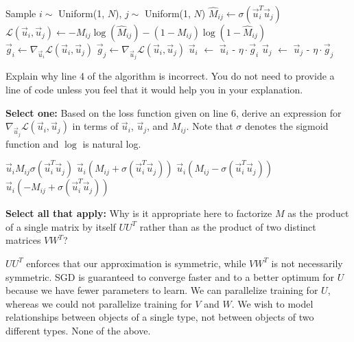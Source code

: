 \documentclass[11pt,addpoints,answers]{exam}
\newcommand{\sall}{\textbf{Select all that apply: }}
\newcommand{\sone}{\textbf{Select one: }}
\begin{document}
\begin{questions}
\begin{parts}
\begin{algorithm}
\begin{algorithmic}[1]
    \State Sample $i \sim$ Uniform(1, $N$), $j \sim$ Uniform(1, $N$)
    \State $\hat{M}_{ij} \gets \sigma(\vec{u}_i^T \vec{u}_j)$ 
    \State $\mathcal{L}(\vec{u}_i, \vec{u}_j) \gets -M_{ij} \log(\hat{M}_{ij}) - (1-M_{ij})\log(1 - \hat{M}_{ij})$
    \State $\vec{g}_i \gets \nabla_{\vec{u}_i} \mathcal{L}(\vec{u}_i, \vec{u}_j)$
    \State $\vec{g}_j \gets \nabla_{\vec{u}_j} \mathcal{L}(\vec{u}_i, \vec{u}_j)$
    \State $\vec{u}_i$ $\gets$ $\vec{u}_i$ - $\eta \cdot \vec{g}_i$
    \State $\vec{u}_j$ $\gets$ $\vec{u}_j$ - $\eta \cdot \vec{g}_j$
\EndWhile
\end{algorithmic}
\end{algorithm}
\newpage
\begin{subparts}
\subpart[1] Explain why line 4 of the algorithm is incorrect.
You do not need to provide a line of code unless you feel that it would help you in your explanation.

    \begin{your_solution}[title=Explanation, height=3cm, width=0.9\textwidth]
    \end{your_solution}

\subpart[1] \sone Based on the loss function given on line 6, derive an expression for $\nabla_{\vec{u}_j} \mathcal{L}(\vec{u}_i, \vec{u}_j)$ in terms of $\vec{u}_i$, $\vec{u}_j$, and $M_{ij}$. Note that $\sigma$ denotes the sigmoid function and $\log$ is natural log.
    \begin{checkboxes}
    \choice $\vec{u}_i M_{ij} \sigma(\vec{u}_i^T \vec{u}_j)$
    \choice $\vec{u}_i(M_{ij} + \sigma(\vec{u}_i^T \vec{u}_j))$
    \choice $\vec{u}_i(M_{ij} - \sigma(\vec{u}_i^T \vec{u}_j))$
    \choice $\vec{u}_i(-M_{ij} + \sigma(\vec{u}_i^T \vec{u}_j))$
    \end{checkboxes}
         
    

\subpart[2] \sall Why is it appropriate here to factorize $M$ as the product of a single matrix by itself $U U^T$ rather than as the product of two distinct matrices $VW^T$?
    {\checkboxchar{$\Box$} \checkedchar{$\blacksquare$}
    \begin{checkboxes}
    \choice $U U^T$ enforces that our approximation is symmetric, while $VW^T$ is not necessarily symmetric.
    \choice SGD is guaranteed to converge faster and to a better optimum for $U$ because we have fewer parameters to learn.
    \choice We can parallelize training for $U$, whereas we could not parallelize training for $V$ and $W$.
    \choice We wish to model relationships between objects of a single type, not between objects of two different types.
    \choice None of the above.
    \end{checkboxes}
    }
    


\end{subparts}
\end{parts}
\end{questions}
\end{document}
